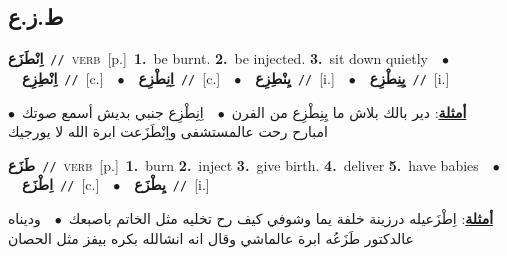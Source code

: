 \documentclass[10pt,a4paper,twoside]{article} %
\begin{document}
\begin{multicols}{2}
\vspace{-3mm}
\subsection*{\color{blue}\foreignlanguage{arabic}{ط.ز.ع}\color{blue}{}} 

{\setlength\topsep{0pt}\textbf{\foreignlanguage{arabic}{اِنْطَزَع}}\ {\color{gray}\texttt{//}\color{black}}\ \textsc{verb}\ [p.]\ \textbf{1.}~be burnt.  \textbf{2.}~be injected.  \textbf{3.}~sit down quietly\ \ $\bullet$\ \ \setlength\topsep{0pt}\textbf{\foreignlanguage{arabic}{اِنْطِزِع}}\ {\color{gray}\texttt{//}\color{black}}\ [c.]\ \ $\bullet$\ \ \setlength\topsep{0pt}\textbf{\foreignlanguage{arabic}{اِنِطْزِع}}\ {\color{gray}\texttt{//}\color{black}}\ [c.]\ \ $\bullet$\ \ \setlength\topsep{0pt}\textbf{\foreignlanguage{arabic}{يِنْطِزِع}}\ {\color{gray}\texttt{//}\color{black}}\ [i.]\ \ $\bullet$\ \ \setlength\topsep{0pt}\textbf{\foreignlanguage{arabic}{يِنِطْزِع}}\ {\color{gray}\texttt{//}\color{black}}\ [i.]\  \begin{flushright}\color{gray}\foreignlanguage{arabic}{\textbf{\underline{\foreignlanguage{arabic}{أمثلة}}}: دير بالك بلاش ما يِنِطْزِع من الفرن\ $\bullet$\ \  اِنِطْزِع جنبي بديش أسمع صوتك\ $\bullet$\ \  امبارح رحت عالمستشفى واِنْطَزَعت ابرة الله لا يورجيك}\end{flushright}\color{black}} \vspace{2mm}

{\setlength\topsep{0pt}\textbf{\foreignlanguage{arabic}{طَزَع}}\ {\color{gray}\texttt{//}\color{black}}\ \textsc{verb}\ [p.]\ \textbf{1.}~burn  \textbf{2.}~inject  \textbf{3.}~give birth.  \textbf{4.}~deliver  \textbf{5.}~have babies\ \ $\bullet$\ \ \setlength\topsep{0pt}\textbf{\foreignlanguage{arabic}{اِطْزَع}}\ {\color{gray}\texttt{//}\color{black}}\ [c.]\ \ $\bullet$\ \ \setlength\topsep{0pt}\textbf{\foreignlanguage{arabic}{يِطْزَع}}\ {\color{gray}\texttt{//}\color{black}}\ [i.]\  \begin{flushright}\color{gray}\foreignlanguage{arabic}{\textbf{\underline{\foreignlanguage{arabic}{أمثلة}}}: اِطْزَعيله درزينة خلفة يما وشوفي كيف رح تخليه مثل الخاتم باصبعك\ $\bullet$\ \  وديناه عالدكتور طَزَعُه ابرة عالماشي وقال انه انشالله بكره بيفز مثل الحصان}\end{flushright}\color{black}} \vspace{2mm}


\end{multicols}
\end{document}
